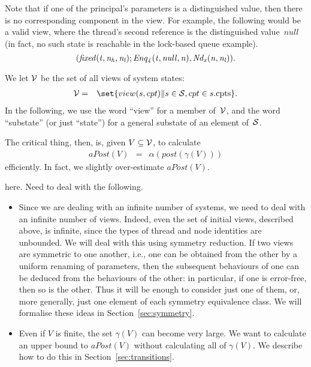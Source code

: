 Note that if one of the principal's parameters is a distinguished value, then
there is no corresponding component in the view.  For example, the following
would be a valid view, where the thread's second reference is the
distinguished value~$null$ (in fact, no such state is reachable in the
lock-based queue example).
\[\it
(fixed(t, n_h, n_l);   Enq_4(t, null, n), \Node_x(n, n_l)).
\]


We let $\V$ be the set of all views of system states:
%
\begin{eqnarray*}
\V & = & 
  \set{view(s, cpt) \| s \in \S, cpt \in s.\cpt}. %
\end{eqnarray*}
%
In the following, we use the word ``view'' for a member of~$\V$, and the word
``substate'' (or just ``state'') for a general substate of an element of~$\S$.



The critical thing, then, is, given $V \subseteq \V$, to calculate
\begin{eqnarray*}
aPost(V) & = & \alpha(post(\gamma(V)))
\end{eqnarray*}
efficiently.  In fact, we slightly over-estimate $aPost(V)$.

 here.  Need to deal with the following.  
%
\begin{itemize}
\item Since we are dealing with an infinite number of systems, we need to deal
  with an infinite number of views.  Indeed, even the set of initial views,
  described above, is infinite, since the types of thread and node identities
  are unbounded.  We will deal with this using symmetry reduction.  If two
  views are symmetric to one another, i.e., one can be obtained from the other
  by a uniform renaming of parameters, then the subsequent behaviours of one
  can be deduced from the behaviours of the other: in particular, if one is
  error-free, then so is the other.  Thus it will be enough to consider just
  one of them, or, more generally, just one element of each symmetry
  equivalence class.  We will formalise these ideas in
  Section~\ref{sec:symmetry}.

\item Even if $V$ is finite, the set $\gamma(V)$ can become very large.  We
  want to calculate an upper bound to $aPost(V)$ without calculating all of
  $\gamma(V)$.  We describe how to do this in Section~\ref{sec:transitions}. 
\end{itemize}

